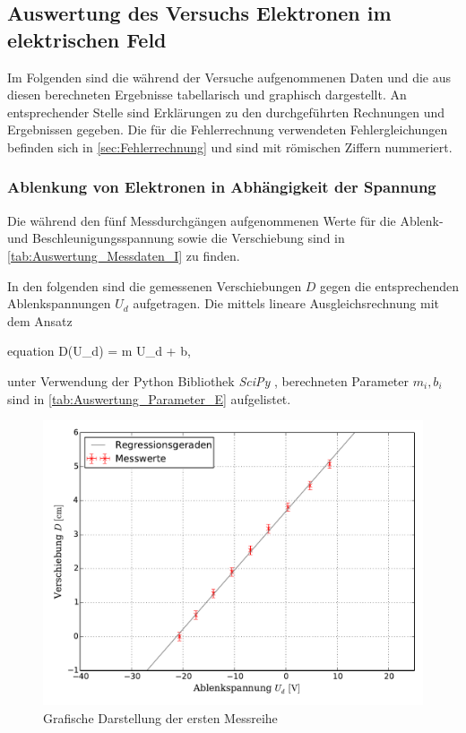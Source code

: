 \subsection{Auswertung des Versuchs Elektronen im elektrischen Feld}
	
	Im Folgenden sind die während der Versuche aufgenommenen Daten
	und die aus diesen berechneten Ergebnisse tabellarisch und graphisch
	dargestellt. An entsprechender Stelle sind Erklärungen zu den 
	durchgeführten Rechnungen und Ergebnissen gegeben.
	Die für die Fehlerrechnung verwendeten Fehlergleichungen befinden 
	sich in \cref{sec:Fehlerrechnung} und sind mit römischen Ziffern nummeriert.

	\subsubsection{Ablenkung von Elektronen in Abhängigkeit der Spannung}
	
		Die während den fünf Messdurchgängen aufgenommenen Werte für die
		Ablenk- und Beschleunigungsspannung sowie die Verschiebung sind in \cref{tab:Auswertung_Messdaten_I} zu finden.
				
			   
		
		In den folgenden  sind die 
		gemessenen Verschiebungen $D$ gegen die entsprechenden Ablenkspannungen $U_{d}$ aufgetragen.
		Die mittels lineare Ausgleichsrechnung mit dem Ansatz 
		\begin{empheq}{equation}
			D(U_{d}) = m \cdot U_{d} + b,
		\end{empheq} 
		unter Verwendung der Python Bibliothek \emph{SciPy} \cite{SciPy},
		berechneten Parameter $m_{i}, b_{i}$ sind in \cref{tab:Auswertung_Parameter_E} aufgelistet.
		
		
		
		
		\begin{figure}[!h]
				\includegraphics[scale=0.7]{Grafiken/EFeld_Messreihe_I.pdf}
				\caption{Grafische Darstellung der ersten Messreihe}\label{fig:Auswertung_Messdaten_I_I}
		\end{figure}
		
